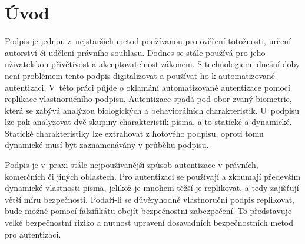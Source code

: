 
%

\chapter{Úvod}
Podpis je jednou z~nejstarších metod používanou pro ověření totožnosti, určení autorství či udělení právního souhlasu.
Dodnes se stále používá pro jeho uživatelskou přívětivost a akceptovatelnost zákonem.
S technologiemi dnešní doby není problémem tento podpis digitalizovat a používat ho k automatizované autentizaci.
V~této práci půjde o oklamání automatizované autentizace pomocí replikace vlastnoručního podpisu.
Autentizace spadá pod obor zvaný biometrie, která se zabývá analýzou biologických a behaviorálních charakteristik. 
U~podpisu lze pak analyzovat dvě skupiny charakteristik písma, a to statické a dynamické. 
Statické charakteristiky lze extrahovat z hotového podpisu, oproti tomu dynamické musí být zaznamenávány v průběhu podpisu.

Podpis je v~praxi stále nejpoužívanější způsob autentizace v právních, komerčních či jiných oblastech. 
Pro autentizaci se používají a zkoumají především dynamické vlastnosti písma, jelikož je mnohem těžší je replikovat, a tedy zajišťují větší míru bezpečnosti.
Podaří-li se důvěryhodně vlastnoruční podpis replikovat, bude možné pomocí falzifikátu obejít bezpečnostní zabezpečení. 
To představuje velké bezpečnostní riziko a nutnost upravení dosavadních bezpečnostních metod pro autentizaci. 




